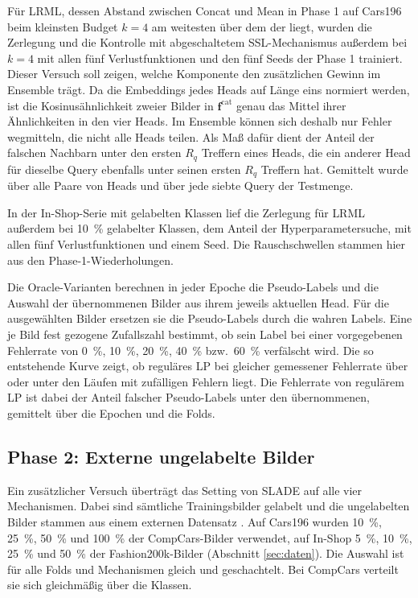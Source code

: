 Für \ac{LRML}, dessen Abstand zwischen Concat und Mean in Phase 1 auf Cars196 beim kleinsten Budget $k=4$ am weitesten über dem der \UEBL liegt, wurden die Zerlegung und die Kontrolle mit abgeschaltetem \ac{SSL}-Mechanismus außerdem bei $k=4$ mit allen fünf Verlustfunktionen und den fünf Seeds der Phase 1 trainiert. Dieser Versuch soll zeigen, welche Komponente den zusätzlichen Gewinn im Ensemble trägt. Da die Embeddings jedes Heads auf Länge eins normiert werden, ist die Kosinusähnlichkeit zweier Bilder in $\bm{f}^{\mathrm{cat}}$ genau das Mittel ihrer Ähnlichkeiten in den vier Heads. Im Ensemble können sich deshalb nur Fehler wegmitteln, die nicht alle Heads teilen. Als Maß dafür dient der Anteil der falschen Nachbarn unter den ersten $R_q$ Treffern eines Heads, die ein anderer Head für dieselbe Query ebenfalls unter seinen ersten $R_q$ Treffern hat. Gemittelt wurde über alle Paare von Heads und über jede siebte Query der Testmenge.

In der In-Shop-Serie mit gelabelten Klassen lief die Zerlegung für \ac{LRML} außerdem bei \qty{10}{\percent} gelabelter Klassen, dem Anteil der Hyperparametersuche, mit allen fünf Verlustfunktionen und einem Seed. Die Rauschschwellen stammen hier aus den Phase-1-Wiederholungen.

Die Oracle-Varianten berechnen in jeder Epoche die Pseudo-Labels und die Auswahl der übernommenen Bilder aus ihrem jeweils aktuellen Head. Für die ausgewählten Bilder ersetzen sie die Pseudo-Labels durch die wahren Labels. Eine je Bild fest gezogene Zufallszahl bestimmt, ob sein Label bei einer vorgegebenen Fehlerrate von \qty{0}{\percent}, \qty{10}{\percent}, \qty{20}{\percent}, \qty{40}{\percent} bzw.\ \qty{60}{\percent} verfälscht wird. Die so entstehende Kurve zeigt, ob reguläres \ac{LP} bei gleicher gemessener Fehlerrate über oder unter den Läufen mit zufälligen Fehlern liegt. Die Fehlerrate von regulärem \ac{LP} ist dabei der Anteil falscher Pseudo-Labels unter den übernommenen, gemittelt über die Epochen und die Folds.  


\subsection{Phase 2: Externe ungelabelte Bilder}
\label{sec:m:extern}

Ein zusätzlicher Versuch überträgt das Setting von \ac{SLADE} auf alle vier Mechanismen. Dabei sind sämtliche Trainingsbilder gelabelt und die ungelabelten Bilder stammen aus einem externen Datensatz \cite{duan_slade_2021}. Auf Cars196 wurden \SI{10}{\percent}, \SI{25}{\percent}, \SI{50}{\percent} und \SI{100}{\percent} der CompCars-Bilder verwendet, auf In-Shop \SI{5}{\percent}, \SI{10}{\percent}, \SI{25}{\percent} und \SI{50}{\percent} der Fashion200k-Bilder (Abschnitt \ref{sec:daten}). Die Auswahl ist für alle Folds und Mechanismen gleich und geschachtelt. Bei CompCars verteilt sie sich gleichmäßig über die Klassen.

